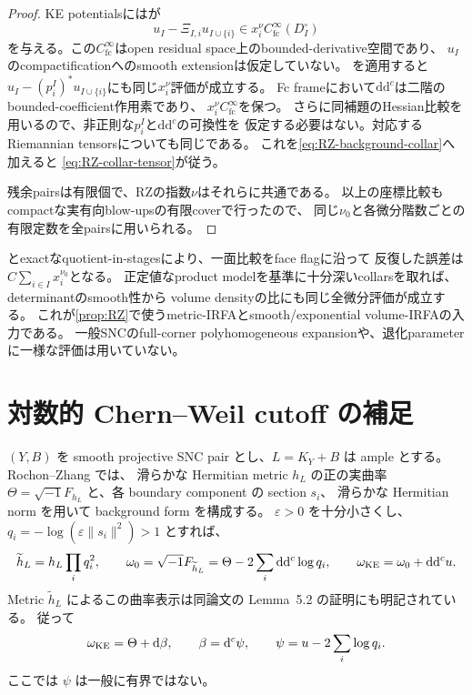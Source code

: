 \documentclass[11pt,a4paper]{ltjsarticle}
\newcommand{\dd}{\mathrm d}
\theoremstyle{plain}
\theoremstyle{definition}
\theoremstyle{remark}
\begin{document}
\begin{proof}
KE potentialsには\cite[Theorem~5.1, (5.10)]{RochonZhang}が
\[
 u_I-\Xi_{I,i}u_{I\cup\{i\}}
 \in x_i^\nu C^\infty_{\mathrm{fc}}(D_I^\circ)
\]
を与える。この$C^\infty_{\mathrm{fc}}$はopen residual space上のbounded-derivative空間であり、
$u_I$のcompactificationへのsmooth extensionは仮定していない。
を適用すると
$u_I-(p_i^I)^*u_{I\cup\{i\}}$にも同じ$x_i^\nu$評価が成立する。
Fc frameにおいて$\dd\dd^c$は二階のbounded-coefficient作用素であり、
$x_i^\nu C^\infty_{\mathrm{fc}}$を保つ。
さらに同補題のHessian比較を用いるので、非正則な$p_i^I$と$\dd\dd^c$の可換性を
仮定する必要はない。対応するRiemannian tensorsについても同じである。
これを\eqref{eq:RZ-background-collar}へ加えると
\eqref{eq:RZ-collar-tensor}が従う。

残余pairsは有限個で、RZの指数$\nu$はそれらに共通である。
以上の座標比較もcompactな実有向blow-upsの有限coverで行ったので、
同じ$\nu_0$と各微分階数ごとの有限定数を全pairsに用いられる。
\end{proof}

とexactなquotient-in-stagesにより、一面比較をface flagに沿って
反復した誤差は$C\sum_{i\in I}x_i^{\nu_0}$となる。
正定値なproduct modelを基準に十分深いcollarsを取れば、determinantのsmooth性から
volume densityの比にも同じ全微分評価が成立する。
これが\cref{prop:RZ}で使うmetric-IRFAとsmooth/exponential volume-IRFAの入力である。
一般SNCのfull-corner polyhomogeneous expansionや、退化parameterに一様な評価は用いていない。

\section{対数的 Chern--Weil cutoff の補足}
\label{app:CW}
$(Y,B)$ を smooth projective SNC pair とし、$L=K_Y+B$ は ample とする。
Rochon--Zhang \cite[(5.1)--(5.6)]{RochonZhang} では、
滑らかな Hermitian metric $h_L$ の正の実曲率
$\Theta=\sqrt{-1}F_{h_L}$ と、各 boundary component の section $s_i$、
滑らかな Hermitian norm を用いて background form を構成する。
$\varepsilon>0$ を十分小さくし、$q_i=-\log(\varepsilon\|s_i\|^2)>1$ とすれば、
\[
 \widetilde h_L=h_L\prod_iq_i^2,
 \qquad
 \omega_0=\sqrt{-1}F_{\widetilde h_L}
          =\Theta-2\sum_i\dd\dd^c\log q_i,
 \qquad
 \omega_{\rm KE}=\omega_0+\dd\dd^cu.
\]
Metric $\widetilde h_L$ によるこの曲率表示は同論文の Lemma~5.2 の証明にも明記されている。
従って
\[
 \omega_{\rm KE}=\Theta+\dd\beta,
 \qquad
 \beta=\dd^c\psi,
 \qquad
 \psi=u-2\sum_i\log q_i.
\]
ここでは $\psi$ は一般に有界ではない。
\end{document}
